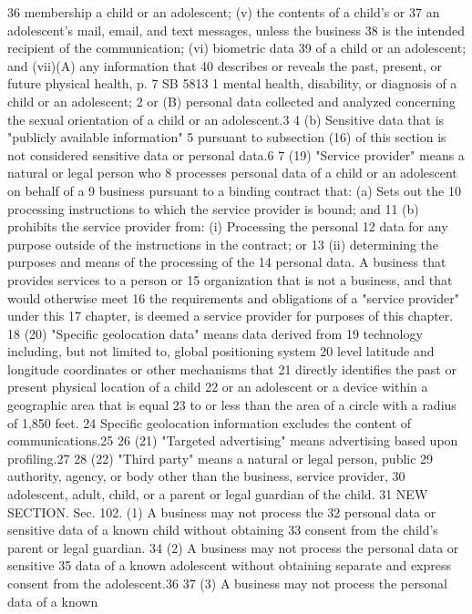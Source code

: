 36 membership a child or an adolescent; (v) the contents of a child's or
37 an adolescent's mail, email, and text messages, unless the business
38 is the intended recipient of the communication; (vi) biometric data
39 of a child or an adolescent; and (vii)(A) any information that
40 describes or reveals the past, present, or future physical health,
p. 7 SB 5813
1 mental health, disability, or diagnosis of a child or an adolescent;
2 or (B) personal data collected and analyzed concerning the sexual
orientation of a child or an adolescent.3
4 (b) Sensitive data that is "publicly available information"
5 pursuant to subsection (16) of this section is not considered
sensitive data or personal data.6
7 (19) "Service provider" means a natural or legal person who
8 processes personal data of a child or an adolescent on behalf of a
9 business pursuant to a binding contract that: (a) Sets out the
10 processing instructions to which the service provider is bound; and
11 (b) prohibits the service provider from: (i) Processing the personal
12 data for any purpose outside of the instructions in the contract; or
13 (ii) determining the purposes and means of the processing of the
14 personal data. A business that provides services to a person or
15 organization that is not a business, and that would otherwise meet
16 the requirements and obligations of a "service provider" under this
17 chapter, is deemed a service provider for purposes of this chapter.
18 (20) "Specific geolocation data" means data derived from
19 technology including, but not limited to, global positioning system
20 level latitude and longitude coordinates or other mechanisms that
21 directly identifies the past or present physical location of a child
22 or an adolescent or a device within a geographic area that is equal
23 to or less than the area of a circle with a radius of 1,850 feet.
24 Specific geolocation information excludes the content of
communications.25
26 (21) "Targeted advertising" means advertising based upon
profiling.27
28 (22) "Third party" means a natural or legal person, public
29 authority, agency, or body other than the business, service provider,
30 adolescent, adult, child, or a parent or legal guardian of the child.
31 NEW SECTION. Sec. 102. (1) A business may not process the
32 personal data or sensitive data of a known child without obtaining
33 consent from the child's parent or legal guardian.
34 (2) A business may not process the personal data or sensitive
35 data of a known adolescent without obtaining separate and express
consent from the adolescent.36
37 (3) A business may not process the personal data of a known
